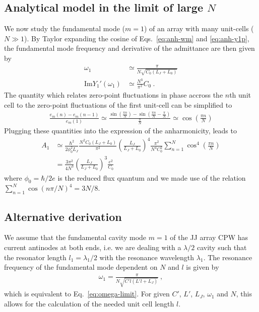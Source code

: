 \subsection{Analytical model in the limit of large $N$}\label{sec:analytical-largeN}

We now study the fundamental mode ($m=1$) of an array with many unit-cells ($N\gg 1$).
%
By Taylor expanding the cosine of Eqs.~\eqref{eq:anh-wm} and \eqref{eq:anh-y1p}, the fundamental mode frequency and derivative of the admittance are then given by
\begin{align}
\omega_1 &\simeq \frac{\pi}{N\sqrt{C_0(L_J+L_0)}} \label{eq:omega-limit}\\
\text{Im}Y_1'(\omega_1) &\simeq\frac{N^3}{\pi^2}C_0\ .
\end{align}
% 
The quantity which relates zero-point fluctuations in phase accross the $n$th unit cell to the zero-point fluctuations of the first unit-cell can be simplified to
\begin{align}
\frac{e_m(n)-e_m(n-1)}{e_m(1)}\simeq \frac{\sin(\frac{\pi n}{N})-\sin(\frac{\pi n}{N}-\frac{\pi}{N})}{\frac{\pi}{N}}\simeq \cos\left(\frac{\pi n}{N}\right)
\end{align}
Plugging these quantities into the expression of the anharmonicity, leads to
\begin{align}
A_1 &\simeq \frac{\hbar^2}{2\phi_0^2L_J }\frac{N^2C_0(L_J+L_0)}{\pi^2}\left(\frac{L_J}{L_J+L_0}\right)^4 \frac{\pi^2}{N^4C_0^2} \sum_{n=1}^{N}\cos^4\left(\frac{\pi n}{N}\right) \\
&= \frac{3\pi^2}{4N^3}\left(\frac{L_J}{L_J+L_0}\right)^3 \frac{e^2}{C_0}
\label{eq:anh-limit}
\end{align}
where $\phi_0 = \hbar/2e$ is the reduced flux quantum and we made use of the relation $\sum_{n=1}^N \cos(n\pi/N)^4=3N/8$.

\subsection{Alternative derivation}

We assume that the fundamental cavity mode $m=1$ of the JJ array CPW has current antinodes at both ends, i.e. we are dealing with a $\lambda/2$ cavity such that the resonator length $l_1 = \lambda_1/2$ with the resonance wavelength $\lambda_1$.
%
The resonance frequency of the fundamental mode dependent on $N$ and $l$ is given by
%
\begin{align}
\omega_1 = \frac{\pi}{N\sqrt{C'l\left(L'l + L_J\right)}} \ ,
\end{align}
%
which is equivalent to Eq.~\eqref{eq:omega-limit}.
% 
For given $C'$, $L'$, $L_J$, $\omega_1$ and $N$, this allows for the calculation of the needed unit cell length $l$.

